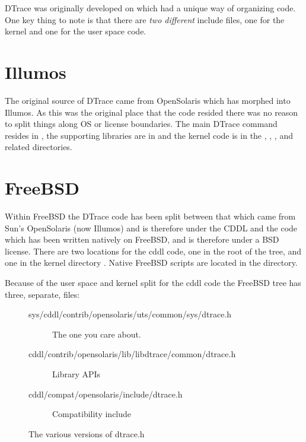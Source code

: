 DTrace was originally developed on  which had a
unique way of organizing code.  One key thing to note is that there
are \emph{two different}  include files, one for the
kernel and one for the user space code.

\section{Illumos}
\label{sec:illumos-code}

The original source of DTrace came from OpenSolaris which has morphed
into Illumos.  As this was the original place that the code resided
there was no reason to split things along OS or license boundaries.
The main DTrace command resides in , the supporting
libraries are in  and the kernel code is in
the , , ,
and related directories.

\section{FreeBSD}
\label{sec:freebsd-code}

Within FreeBSD the DTrace code has been split between that which came
from Sun's OpenSolaris (now Illumos) and is therefore under the CDDL
and the code which has been written natively on FreeBSD, and is
therefore under a BSD license.  There are two locations for the cddl
code, one in the root of the tree,  and one in the
kernel directory .  Native FreeBSD scripts are
located in the  directory.

Because of the user space and kernel split for the cddl code the
FreeBSD tree has three, separate,  files:

\begin{figure}
  \centering
\begin{description}
\item [sys/cddl/contrib/opensolaris/uts/common/sys/dtrace.h] The one
  you care about.
\item [cddl/contrib/opensolaris/lib/libdtrace/common/dtrace.h] Library APIs
\item [cddl/compat/opensolaris/include/dtrace.h] Compatibility include
\end{description}
  \caption{The various versions of dtrace.h}
  \label{fig:freebsd-dtrace-h}
\end{figure}

